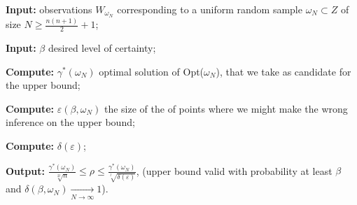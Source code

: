 \begin{alg}

\textbf{Input:} observations $W_{\omega_N}$ corresponding to a uniform random sample $\omega_N \subset Z$ of size $N \geq \frac{n(n+1)}{2}+1$;

\textbf{Input:} $\beta$ desired level of certainty;

\textbf{Compute:} $\gamma^{*}(\omega_N)$ optimal solution of Opt($\omega_N$), that we take as candidate for the upper bound;

\textbf{Compute:} $\varepsilon(\beta,\omega_N)$ the size of the of points where we might make the wrong inference on the upper bound;

\textbf{Compute:} $\delta(\varepsilon)$;

\textbf{Output:} $\frac{\gamma^{*}(\omega_N)}{\sqrt[2l]{n}} \leq \rho \leq \frac{\gamma^{*}(\omega_N)}{\sqrt[l]{\delta(\varepsilon)}}$, (upper bound valid with probability at least $\beta$ and $\delta(\beta, \omega_N)   \xrightarrow[N \to \infty]{} 1$).
\end{alg}
